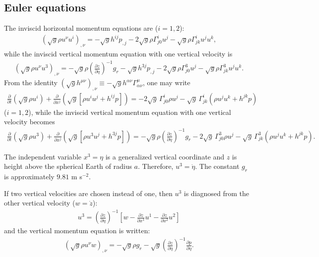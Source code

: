 \documentclass{article}
\begin{document}
\subsection{Euler equations}
The inviscid horizontal momentum equations are ($i=1,2$):
\begin{align}
\left( \sqrt{g}\rho u^\nu u^i\right)_{,\nu} = - \sqrt{g}h^{ij}p_{,j} -2\sqrt{g} \rho \Gamma^i_{j0} u^j - \sqrt{g} \rho \Gamma^i_{jk}u^ju^k,
\end{align}
while the inviscid vertical momentum equation with one vertical velocity is
\begin{align}
\left( \sqrt{g}\rho u^\nu u^3\right)_{,\nu} = - \sqrt{g} \rho \left(\frac{\partial z}{\partial \eta}\right)^{-1} g_r - \sqrt{g}h^{3j}p_{,j} -2\sqrt{g} \rho \Gamma^3_{j0} u^j - \sqrt{g} \rho \Gamma^3_{jk}u^ju^k.
\end{align}
From the identity $(\sqrt{g}h^{\mu\nu})_{,\nu}\equiv -\sqrt{g}h^{\alpha\nu}\Gamma^\mu_{\alpha\nu}$, one may write
\begin{align}
\frac{\partial}{\partial t}\left( \sqrt{g}\rho u^i\right) + \frac{\partial}{\partial x^j}\left( \sqrt{g}\left[\rho u^iu^j+h^{ij}p\right]\right) = -2\sqrt{g} \, \Gamma^i_{j0} \rho u^j - \sqrt{g} \, \Gamma^i_{jk}\left(\rho u^ju^k+h^{jk}p\right)
\end{align}
($i=1,2$), while the inviscid vertical momentum equation with one vertical velocity becomes
\begin{align}
\frac{\partial}{\partial t}\left( \sqrt{g}\rho u^3\right) + \frac{\partial}{\partial x^j}\left( \sqrt{g}\left[\rho u^3 u^j + h^{3j}p\right]\right)= - \sqrt{g} \rho \left(\frac{\partial z}{\partial \eta}\right)^{-1} g_r -2\sqrt{g} \, \Gamma^3_{j0} \rho u^j - \sqrt{g} \, \Gamma^3_{jk}\left(\rho u^ju^k+h^{jk}p\right).
\end{align}

The independent variable $x^3=\eta$ is a generalized vertical coordinate and $z$ is height above the spherical Earth of radius $a$. Therefore, $u^3=\dot\eta$. The constant $g_r$ is approximately $9.81$ m s$^{-2}$.

If two vertical velocities are chosen instead of one, then $u^3$ is diagnosed from the other vertical velocity ($w=\dot z$):
\begin{align}
u^3=\left(\frac{\partial z}{\partial \eta}\right)^{-1}\left[ w - \frac{\partial z}{\partial x^1} u^1 - \frac{\partial z}{\partial x^2} u^2 \right]
\end{align}
and the vertical momentum equation is written:
\begin{align}
\left(\sqrt{g}\rho u^\nu w\right)_{,\nu}=-\sqrt{g}\rho g_r-\sqrt{g} \left(\frac{\partial z}{\partial \eta}\right)^{-1} \frac{\partial p}{\partial\eta}.
\end{align}
\end{document}
